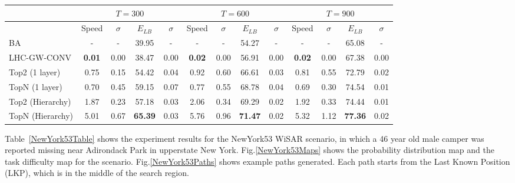 \begin{center}
\begin{table*}
{
\scriptsize
\hfill{}
\setlength{\extrarowheight}{1.5pt}
\begin{tabular}
{|l|c|c|c|c|c|c|c|c|c|c|c|c|}
\hline
& \multicolumn{4}{|c|}{$T=300$} & \multicolumn{4}{|c|}{$T=600$} & \multicolumn{4}{|c|}{$T=900$} \\ 
\hline
& Speed & $\sigma$ & $\mathit{E_{LB}}$ & $\sigma$ & Speed & $\sigma$ & $\mathit{E_{LB}}$ & $\sigma$ & Speed & $\sigma$ & $\mathit{E_{LB}}$ & $\sigma$\\ 
\hline
BA & - & - & 39.95 & - & - & - & 54.27 & - & - & - & 65.08 & - \\ 
\hline
LHC-GW-CONV & \textbf{0.01} & 0.00 & 38.47 & 0.00 & \textbf{0.02} & 0.00 & 56.91 & 0.00 & \textbf{0.02} & 0.00 & 67.38 & 0.00\\ 
\hline
Top2 (1 layer) & 0.75 & 0.15 & 54.42 & 0.04 & 0.92 & 0.60 & 66.61 & 0.03 & 0.81 & 0.55 & 72.79 & 0.02\\ 
\hline
TopN (1 layer) & 0.70 & 0.45 & 59.15 & 0.07 & 0.77 & 0.55 & 68.78 & 0.04 & 0.69 & 0.30 & 74.54 & 0.01\\ 
\hline
Top2 (Hierarchy) & 1.87 & 0.23 & 57.18 & 0.03 & 2.06 & 0.34 & 69.29 & 0.02 & 1.92 & 0.33 & 74.44 & 0.01\\ 
\hline
TopN (Hierarchy) & 5.01 & 0.67 & \textbf{65.39} & 0.03 & 5.76 & 0.96 & \textbf{71.47} & 0.02 & 5.32 & 1.12 & \textbf{77.36} & 0.02\\ 
\hline
\end{tabular}}
\medskip
\caption{Algorithms speed and $\mathit{Efficiency_{LB}}$ comparison for the NewYork53 scenario.}
\label{NewYork53Table}
\end{table*}
\end{center}
Table~\ref{NewYork53Table} shows the experiment results for the NewYork53 WiSAR scenario, in which a 46 year old male camper was reported missing near Adirondack Park in upperstate New York. Fig.\ref{NewYork53Maps} shows the probability distribution map and the task difficulty map for the scenario. Fig.\ref{NewYork53Paths} shows example paths generated. Each path starts from the Last Known Position (LKP), which is in the middle of the search region.

